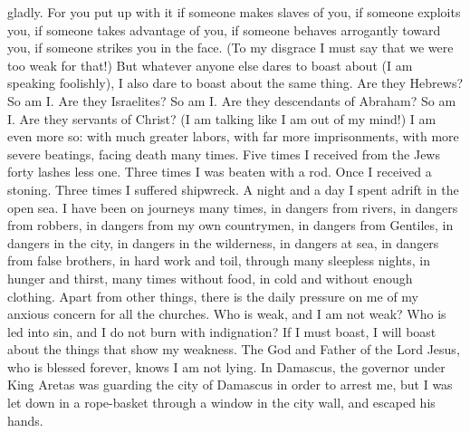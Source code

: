 {gladly.
For
you put up
with it if
someone
makes slaves
of you,
if
someone
exploits
you, if
someone
takes advantage
of you, if
someone
behaves arrogantly
toward you, if
someone
strikes
you
in
the face.
(To
my disgrace
I must say
that
we
were
too weak
for
that!) But
whatever
anyone
else dares
to boast about (I am speaking
foolishly), I also
dare to boast about the same thing.
Are they
Hebrews? So
am I.
Are they
Israelites? So
am I.
Are they
descendants
of Abraham? So
am I.
Are they
servants
of Christ? (I am talking
like I
am out of
my mind!) I am even more so: with much greater
labors,
with
far more
imprisonments,
with
more severe
beatings,
facing
death
many times.
Five times
I received
from
the Jews
forty
lashes less
one.
Three times
I was beaten with a rod.
Once
I received a stoning.
Three times
I suffered shipwreck.
A night and a day
I spent
adrift in
the open sea.
I have been on journeys
many times,
in dangers
from rivers,
in dangers
from robbers,
in dangers
from
my own countrymen,
in dangers
from
Gentiles,
in dangers
in
the city,
in dangers
in
the wilderness,
in dangers
at
sea,
in dangers
from
false brothers,
in hard work
and
toil,
through
many
sleepless nights,
in
hunger
and
thirst,
many times
without food,
in
cold
and
without enough clothing.
Apart from
other things,
there is the daily
pressure
on me
of my anxious concern
for all
the churches.
Who
is weak,
and
I am
not
weak? Who
is led into sin,
and
I
do
not
burn with indignation?
If
I
must
boast,
I will boast
about the things that show my
weakness.
The God
and
Father
of the Lord
Jesus,
who is
blessed
forever,
knows
I am
not
lying.
In
Damascus,
the governor
under King
Aretas
was guarding
the city
of Damascus
in order to arrest
me,
but
I was let down
in
a rope-basket
through
a window
in the city wall,
and
escaped
his
hands.

}

